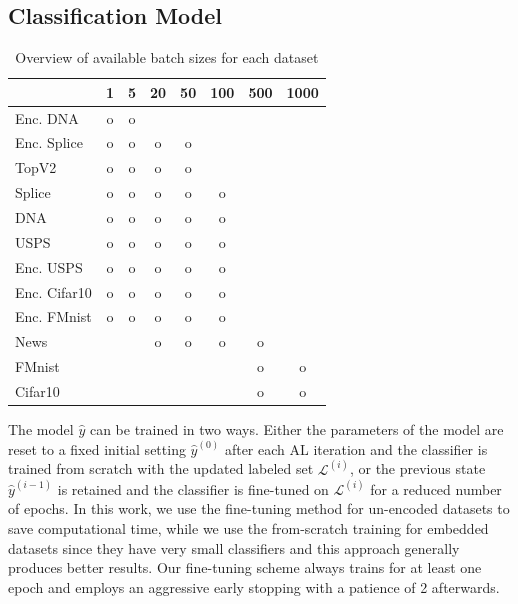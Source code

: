 \documentclass[]{article}
\begin{document}
\subsection{Classification Model}\label{sec:choosing_the_classifier}
\begin{table}
    \vspace{-0.7cm}
    \caption{Overview of available batch sizes for each dataset}
    \vspace{0.1cm}
    \label{tab:batch_sizes}
    \begin{tabular}{l|c|c|c|c|c|c|c}
                    & 1 & 5 & 20 & 50 & 100 & 500 & 1000 \\
         \hline
        Enc. DNA    & o & o &&&&& \\
        Enc. Splice & o & o & o & o &&&\\
        TopV2       & o & o & o & o &&& \\
        Splice      & o & o & o & o & o && \\
        DNA         & o & o & o & o & o && \\
        USPS        & o & o & o & o & o && \\
        Enc. USPS   & o & o & o & o & o && \\
        Enc. Cifar10& o & o & o & o & o && \\
        Enc. FMnist & o & o & o & o & o && \\
        News        &&& o & o & o & o &\\
        FMnist      &&&&&& o & o\\
        Cifar10     &&&&&& o & o \\
    \end{tabular}
    \vspace{-0.35cm}
\end{table}
The model $\hat y$ can be trained in two ways. Either the parameters of the model are reset to a fixed initial setting $\hat y^{(0)}$ after each AL iteration and the classifier is trained from scratch with the updated labeled set $\mathcal{L}^{(i)}$, or the previous state $\hat y^{(i-1)}$ is retained and the classifier is fine-tuned on $\mathcal{L}^{(i)}$ for a reduced number of epochs.
In this work, we use the fine-tuning method for un-encoded datasets to save computational time, while we use the from-scratch training for embedded datasets since they have very small classifiers and this approach generally produces better results.
Our fine-tuning scheme always trains for at least one epoch and employs an aggressive early stopping with a patience of 2 afterwards.\\
\end{document}
